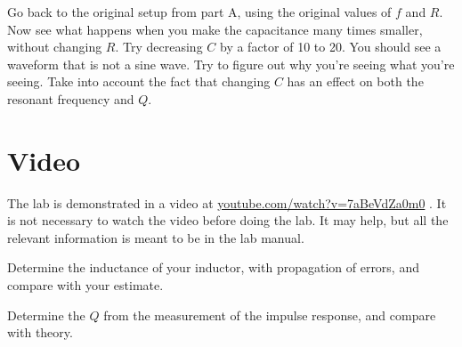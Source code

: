 
Go back to the original setup from part A, using the original values of $f$ and $R$.
Now see what happens when you make the
capacitance many times smaller, without changing $R$. Try decreasing $C$ by a factor of 10 to 20.
You should see a waveform that is not a sine wave. Try to figure out why
you're seeing what you're seeing. Take into account the fact that changing $C$
has an effect on both the resonant frequency and $Q$.

\section*{Video}

The lab is demonstrated in a video at
\url{youtube.com/watch?v=7aBeVdZa0m0} . It is not necessary to watch the video
before doing the lab. It may help, but all the relevant information is meant to
be in the lab manual.


\analysis

Determine the inductance of your inductor, with propagation of errors, and compare
with your estimate.

Determine the $Q$ from the measurement of the impulse response, and compare with theory.
